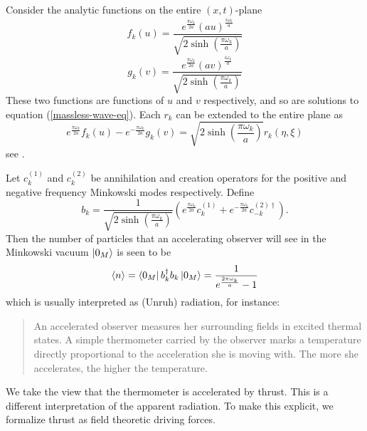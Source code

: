 \documentclass[12pt,a4paper]{article}
\begin{document}
Consider the analytic functions on the entire $(x,t)$-plane
\begin{equation}
f_k(u) = \frac{e^{\frac{\pi \omega_k}{2a}} {(au)}^{\frac{i\omega_k}{a}}}{ \sqrt{2\sinh\left(\frac{\pi\omega_k}{a}\right)}}
\end{equation}
\begin{equation}
g_k(v) = \frac{e^{\frac{\pi \omega_k}{2a}} {(av)}^{\frac{i\omega_k}{a}}}{ \sqrt{2\sinh\left(\frac{\pi\omega_k}{a}\right)} }
\end{equation}
These two functions are functions of $u$ and $v$ respectively, and so are solutions to equation (\ref{massless-wave-eq}).  Each $r_k$ can be extended to the entire plane as
\begin{equation}
e^\frac{\pi\omega_k}{2a} f_k(u) - e^{-\frac{\pi\omega_k}{2a}} g_k(v)  = \sqrt{2 \sinh \left({\frac{\pi\omega_k}{a}}\right)} r_k(\eta,\xi)
\end{equation}
see \cite{Frodden}.

Let $c_k^{(1)}$ and $c_k^{(2)}$ be annihilation and creation operators for the positive and negative frequency Minkowski modes respectively.  Define
\begin{equation}
  b_k = \frac{1}{\sqrt{2 \sinh\left(\frac{\pi \omega_k}{a}\right)}} \left( e^{\frac{\pi\omega_k}{2a}} c_k^{(1)} + e^{-\frac{\pi\omega_k}{2a}} c_{-k}^{(2) \dagger} \right).
\end{equation}
Then the number of particles that an accelerating observer will see in the Minkowski vacuum $\ket{0_M}$ is seen to be 
\begin{equation}
\label{radeq}
\braket{n} = \bra{0_M} b_k^\dagger b_k \ket{0_M} = \frac{1}{e^{\frac{2 \pi \omega_k}{a}}-1}
\end{equation}
which is usually interpreted as (Unruh) radiation, for instance:

\begin{quote}
  An accelerated observer measures her surrounding fields in excited thermal states. A simple thermometer carried by the observer marks a temperature directly proportional to the acceleration she is moving with. The more she accelerates, the higher the temperature.
\end{quote}
We take the view that the thermometer is accelerated by thrust.  This is a different interpretation of the apparent radiation.  To make this explicit, we formalize thrust as field theoretic driving forces.
\end{document}
